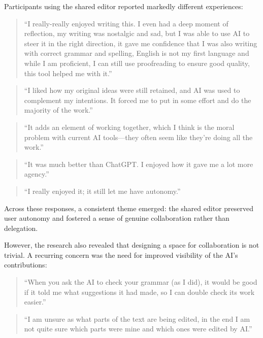 Participants using the shared editor reported markedly different experiences:

\begin{quote}
``I really-really enjoyed writing this. I even had a deep moment of reflection, my writing was nostalgic and sad, but I was able to use AI to steer it in the right direction, it gave me confidence that I was also writing with correct grammar and spelling, English is not my first language and while I am proficient, I can still use proofreading to ensure good quality, this tool helped me with it.''
\end{quote}

\begin{quote}
``I liked how my original ideas were still retained, and AI was used to complement my intentions. It forced me to put in some effort and do the majority of the work.''
\end{quote}

\begin{quote}
``It adds an element of working together, which I think is the moral problem with current AI tools—they often seem like they're doing all the work.''
\end{quote}

\begin{quote}
``It was much better than ChatGPT. I enjoyed how it gave me a lot more agency.''
\end{quote}

\begin{quote}
``I really enjoyed it; it still let me have autonomy.''
\end{quote}

Across these responses, a consistent theme emerged: the shared editor preserved user autonomy and fostered a sense of genuine collaboration rather than delegation.

However, the research also revealed that designing a space for collaboration is not trivial. A recurring concern was the need for improved visibility of the AI's contributions:

\begin{quote}
``When you ask the AI to check your grammar (as I did), it would be good if it told me what suggestions it had made, so I can double check its work easier.''
\end{quote}

\begin{quote}
``I am unsure as what parts of the text are being edited, in the end I am not quite sure which parts were mine and which ones were edited by AI.''
\end{quote}

